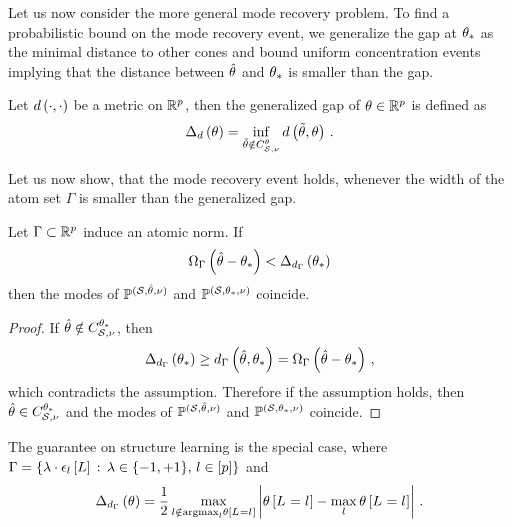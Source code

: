 


Let us now consider the more general mode recovery problem.
To find a probabilistic bound on the mode recovery event, we generalize the gap at $\theta_{*}$ as the minimal distance to other cones and bound uniform concentration events implying that the distance between $\hat{\theta}$ and $\theta_{*}$ is smaller than the gap.

\begin{definition}
    Let $d\left(\cdot,\cdot\right)$ be a metric on $\mathbb{R}^{p}$, then the generalized gap of $\theta\in\mathbb{R}^{p}$ is defined as
    \begin{align*}
        \Delta_{d}\left(\theta\right) = \inf_{\tilde{\theta}\notin C_{\mathcal{S},\nu}^{\theta}} d\left(\tilde{\theta},\theta\right) \, .
    \end{align*}
\end{definition}

Let us now show, that the mode recovery event holds, whenever the width of the atom set $\Gamma$ is smaller than the generalized gap.

\begin{theorem}
    Let $\Gamma\subset\mathbb{R}^{p}$ induce an atomic norm.
    If
    \begin{align*}
        \Omega_{\Gamma}\left(\hat{\theta}-\theta_{*}\right) < \Delta_{d_{\Gamma}}\left(\theta_{*}\right)
    \end{align*}
    then the modes of $\mathbb{P}^{(\mathcal{S},\hat{\theta},\nu)}$ and $\mathbb{P}^{(\mathcal{S},\theta_{*},\nu)}$ coincide.
\end{theorem}
\begin{proof}
    If $\hat{\theta}\notin C_{\mathcal{S},\nu}^{\theta_{*}}$, then
    \begin{align*}
        \Delta_{d_{\Gamma}}\left(\theta_{*}\right) \geq d_{\Gamma}\left(\hat{\theta},\theta_{*}\right) = \Omega_{\Gamma}\left(\hat{\theta}-\theta_{*}\right) \, ,
    \end{align*}
    which contradicts the assumption.
    Therefore if the assumption holds, then $\hat{\theta}\in C_{\mathcal{S},\nu}^{\theta_{*}}$ and the modes of $\mathbb{P}^{(\mathcal{S},\hat{\theta},\nu)}$ and $\mathbb{P}^{(\mathcal{S},\theta_{*},\nu)}$ coincide.
\end{proof}

The guarantee on structure learning is the special case, where $\Gamma=\{\lambda\cdot \epsilon_{l}\left[L\right] \,:\, \lambda\in\{-1,+1\},\, l\in[p]\}$ and
\begin{align*}
    \Delta_{d_{\Gamma}}\left(\theta\right)
    = \frac{1}{2} \max_{l\notin\mathrm{argmax}_{l}\theta\left[L_{}=l_{}\right]} \left| \theta\left[L_{}=l_{}\right] - \max_{l}\theta\left[L_{}=l_{}\right] \right| \, .
\end{align*}





